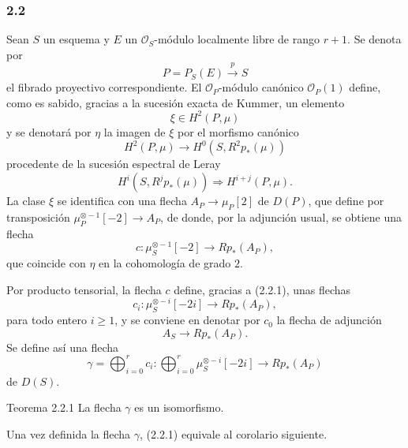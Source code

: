 \subsubsection*{2.2}
Sean $S$ un esquema y $E$ un $\mathcal O_S$-módulo localmente libre de rango $r+1$. Se denota por
\[
P=P_S(E)\xrightarrow{p}S
\]
el fibrado proyectivo correspondiente. El $\mathcal O_P$-módulo canónico $\mathcal O_P(1)$ define, como es sabido, gracias a la sucesión exacta de Kummer, un elemento
\[
\xi\in H^2(P,\mu)
\]
y se denotará por $\eta$ la imagen de $\xi$ por el morfismo canónico
\[
H^2(P,\mu)\longrightarrow H^0(S,R^2p_*(\mu))
\]
procedente de la sucesión espectral de Leray
\[
H^i(S,R^jp_*(\mu))\Rightarrow H^{i+j}(P,\mu).
\]
La clase $\xi$ se identifica con una flecha $A_P\to\mu_P[2]$ de $D(P)$, que define por transposición $\mu_P^{\otimes -1}[-2]\to A_P$, de donde, por la adjunción usual, se obtiene una flecha
\[
c:\mu_S^{\otimes -1}[-2]\longrightarrow Rp_*(A_P),
\]
que coincide con $\eta$ en la cohomología de grado $2$.

Por producto tensorial, la flecha $c$ define, gracias a (2.2.1), unas flechas
\[
c_i:\mu_S^{\otimes -i}[-2i]\longrightarrow Rp_*(A_P),
\]
para todo entero $i\ge1$, y se conviene en denotar por $c_0$ la flecha de adjunción
\[
A_S\longrightarrow Rp_*(A_P).
\]
Se define así una flecha
\[
\gamma=\bigoplus_{i=0}^{r}c_i:
\bigoplus_{i=0}^{r}\mu_S^{\otimes -i}[-2i]\longrightarrow Rp_*(A_P)
\]
de $D(S)$.

\begin{statement}{Teorema 2.2.1}
La flecha $\gamma$ es un isomorfismo.
\end{statement}

Una vez definida la flecha $\gamma$, (2.2.1) equivale al corolario siguiente.
